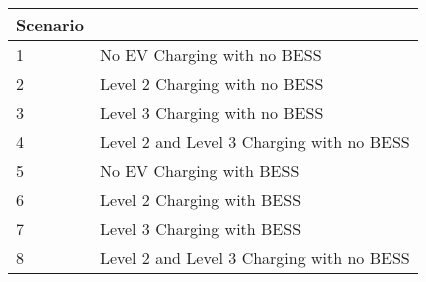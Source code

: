\begin{tabularx}{\linewidth}{X | l}
\toprule
 Scenario &  \\
\midrule
		1  & No EV Charging with no BESS \\
        2 & Level 2 Charging with no BESS  \\
        3 & Level 3 Charging with no BESS  \\
        4 & Level 2 and Level 3 Charging with no BESS \\
        5 & No EV Charging with BESS \\
        6 & Level 2 Charging with BESS  \\
        7 & Level 3 Charging with BESS \\
        8 & Level 2 and Level 3 Charging with no BESS \\
\bottomrule
\end{tabularx}
